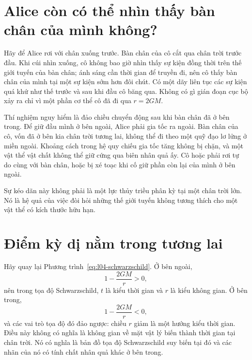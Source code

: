 \section{Alice còn có thể nhìn thấy bàn chân của mình không?}

Hãy để Alice rơi với chân xuống trước. Bàn chân của cô cắt qua chân trời trước đầu. Khi cúi nhìn xuống, cô không bao giờ nhìn thấy sự kiện đồng thời trên thế giới tuyến của bàn chân; ánh sáng cần thời gian để truyền đi, nên cô thấy bàn chân của mình tại một sự kiện sớm hơn đôi chút. Có một dãy liên tục các sự kiện quá khứ như thế trước và sau khi đầu cô băng qua. Không có gì gián đoạn cục bộ xảy ra chỉ vì một phần cơ thể cô đã đi qua \(r=2GM\).

Thí nghiệm nguy hiểm là đảo chiều chuyển động sau khi bàn chân đã ở bên trong. Để giữ đầu mình ở bên ngoài, Alice phải gia tốc ra ngoài. Bàn chân của cô, vốn đã ở bên kia chân trời tương lai, không thể đi theo một quỹ đạo lơ lửng ở miền ngoài. Khoảng cách trong hệ quy chiếu gia tốc tăng không bị chặn, và một vật thể vật chất không thể giữ cứng qua biên nhân quả ấy. Cô hoặc phải rơi tự do cùng với bàn chân, hoặc bị xé toạc khi cố giữ phần còn lại của mình ở bên ngoài.

Sự kéo dãn này không phải là một lực thủy triều phân kỳ tại một chân trời lớn. Nó là hệ quả của việc đòi hỏi những thế giới tuyến không tương thích cho một vật thể có kích thước hữu hạn.

\section{Điểm kỳ dị nằm trong tương lai}

Hãy quay lại Phương trình~\eqref{eq:l04-schwarzschild}. Ở bên ngoài,
\begin{equation}
1-\frac{2GM}{r}>0,
\end{equation}
nên trong tọa độ Schwarzschild, \(t\) là kiểu thời gian và \(r\) là kiểu không gian. Ở bên trong,
\begin{equation}
1-\frac{2GM}{r}<0,
\end{equation}
và các vai trò tọa độ đó đảo ngược: chiều \(r\) giảm là một hướng kiểu thời gian. Điều này không có nghĩa là không gian về mặt vật lý biến thành thời gian tại chân trời. Nó có nghĩa là bản đồ tọa độ Schwarzschild suy biến tại đó và các nhãn của nó có tính chất nhân quả khác ở bên trong.

